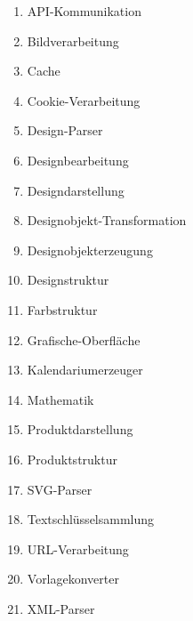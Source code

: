 \begin{enumerate}
\item{API-Kommunikation} 
\item{Bildverarbeitung}  
\item{Cache} 
\item{Cookie-Verarbeitung}  
\item{Design-Parser} 	
\item{Designbearbeitung} 
\item{Designdarstellung}  
\item{Designobjekt-Transformation}
\item{Designobjekterzeugung} 
\item{Designstruktur} 
\item{Farbstruktur} 
\item{Grafische-Oberfläche} 
\item{Kalendariumerzeuger} 
\item{Mathematik}  
\item{Produktdarstellung} 
\item{Produktstruktur} 
\item{SVG-Parser} 
\item{Textschlüsselsammlung} 
\item{URL-Verarbeitung} 
\item{Vorlagekonverter} 
\item{XML-Parser}	
\end{enumerate} 